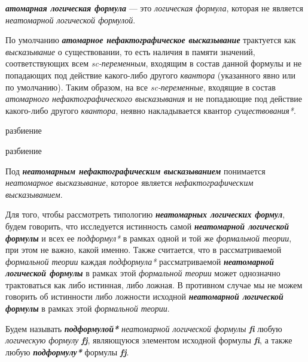 \textbf{\textit{атомарная логическая формула}} --- это \textit{логическая формула}, которая не является \textit{неатомарной логической формулой}.

По умолчанию \textbf{\textit{атомарное нефактографическое высказывание}} трактуется как \textit{высказывание} о существовании, то есть наличия в памяти значений, соответствующих всем \textit{sc-переменным}, входящим в состав данной формулы и не попадающих под действие какого-либо другого \textit{квантора} (указанного явно или по умолчанию). Таким образом, на все \textit{sc-переменные}, входящие в состав \textit{атомарного нефактографического высказывания} и не попадающие под действие какого-либо другого \textit{квантора}, неявно накладывается квантор \textit{существования*}.

\begin{SCn}
\begin{scnrelfromset}{разбиение}
	\begin{scnindent}
		\begin{scnrelfromset}{разбиение}
		\end{scnrelfromset}
	\end{scnindent}
\end{scnrelfromset}
\end{SCn}

Под \textbf{\textit{неатомарным нефактографическим высказыванием}} понимается \textit{неатомарное высказывание}, которое является \textit{нефактографическим высказыванием}.

Для того, чтобы рассмотреть типологию \textbf{\textit{неатомарных логических формул}}, будем говорить, что исследуется истинность самой \textbf{\textit{неатомарной логической формулы}} и всех ее \textit{подформул*} в рамках одной и той же \textit{формальной теории}, при этом не важно, какой именно. Также считается, что в рассматриваемой \textit{формальной теории} каждая \textit{подформула*} рассматриваемой \textbf{\textit{неатомарной логической формулы}} в рамках этой \textit{формальной теории} может однозначно трактоваться как либо истинная, либо ложная. В противном случае мы не можем говорить об истинности либо ложности исходной \textbf{\textit{неатомарной логической формулы}} в рамках этой \textit{формальной теории}.

Будем называть \textbf{\textit{подформулой*}} \textit{неатомарной логической формулы} \textbf{\textit{fi}} любую \textit{логическую формулу} \textbf{\textit{fj}}, являющуюся элементом исходной формулы \textbf{\textit{fi}}, а также любую \textbf{\textit{подформулу*}} формулы \textbf{\textit{fj}}.

